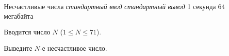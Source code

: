 \begin{problem}%
{Несчастливые числа}%
{\textsl{стандартный ввод}}%
{\textsl{стандартный вывод}}%
{1 секунда}%
{64 мегабайта}{}

\InputFile

Вводится число $N$ ($1 \le N \le 71$).

\OutputFile

Выведите $N$-е несчастливое число.

\Examples

\begin{example}
%
%
\end{example}
\end{problem}
